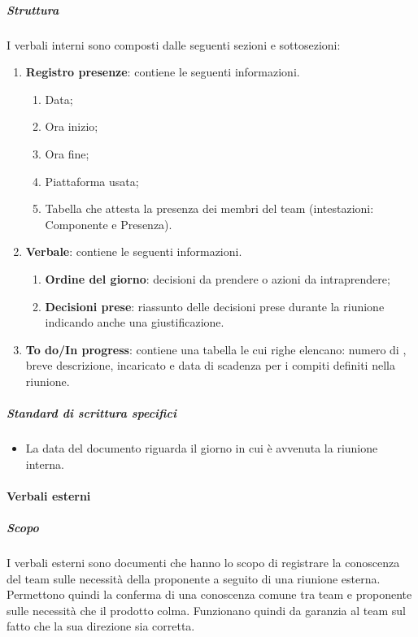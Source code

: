 \subparagraph{Struttura}
I verbali interni sono composti dalle seguenti sezioni e sottosezioni:
\begin{enumerate}
    \item \textbf{Registro presenze}: contiene le seguenti informazioni.
    \begin{enumerate}
        \item Data;
        \item Ora inizio;
        \item Ora fine;
        \item Piattaforma usata;
        \item Tabella che attesta la presenza dei membri del team
        (intestazioni: Componente e Presenza).
    \end{enumerate}
    \item \textbf{Verbale}: contiene le seguenti informazioni.
    \begin{enumerate}
        \item \textbf{Ordine del giorno}: decisioni da prendere o azioni da intraprendere;
        \item \textbf{Decisioni prese}: riassunto delle decisioni prese durante la riunione indicando anche una giustificazione.
    \end{enumerate}

    \item \textbf{To do/In progress}: contiene una tabella le cui righe elencano: numero di , breve descrizione, incaricato e data di scadenza per i compiti definiti nella riunione.
\end{enumerate}

\subparagraph{Standard di scrittura specifici}
\begin{itemize}
    \item La data del documento riguarda il giorno in cui è avvenuta la riunione interna.
\end{itemize}

\paragraph{Verbali esterni}

\subparagraph{Scopo}
I verbali esterni sono documenti che hanno lo scopo di registrare la conoscenza del team sulle necessità della proponente a seguito di una riunione esterna.
Permettono quindi la conferma di una conoscenza comune tra team e proponente sulle necessità che il prodotto colma.
Funzionano quindi da garanzia al team sul fatto che la sua direzione sia corretta.

